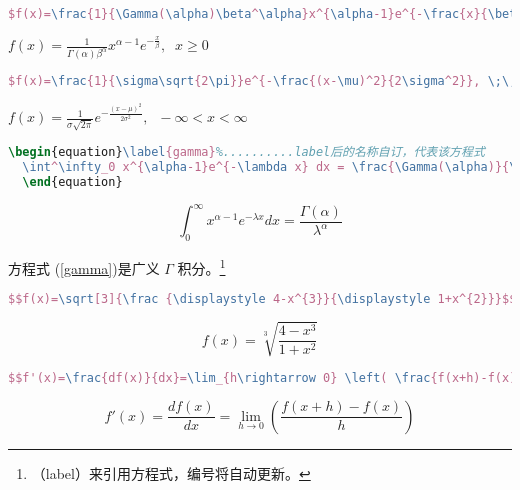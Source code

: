   \begin{lstlisting}[language=TeX,numbers=none,frame=lrtb,keywords={begin},label=Gamma,caption=Gamma] 
  $f(x)=\frac{1}{\Gamma(\alpha)\beta^\alpha}x^{\alpha-1}e^{-\frac{x}{\beta}}, \;\; x\geq 0$
  \end{lstlisting}
  $f(x)=\frac{1}{\Gamma(\alpha)\beta^\alpha}x^{\alpha-1}e^{-\frac{x}{\beta}}, \;\; x\geq 0$ 
  
  \begin{lstlisting}[language=TeX,numbers=none,frame=lrtb,keywords={begin},label=Normal,caption=Normal] 
  $f(x)=\frac{1}{\sigma\sqrt{2\pi}}e^{-\frac{(x-\mu)^2}{2\sigma^2}}, \;\;  -\infty < x < \infty $
  \end{lstlisting}
  $f(x)=\frac{1}{\sigma\sqrt{2\pi}}e^{-\frac{(x-\mu)^2}{2\sigma^2}}, \;\;  -\infty < x < \infty $
  
    \begin{lstlisting}[language=TeX,numbers=none,frame=lrtb,keywords={begin},label=Int,caption=\song 积分式与方程式编号] 
  \begin{equation}\label{gamma}%..........label后的名称自订，代表该方程式
  \int^\infty_0 x^{\alpha-1}e^{-\lambda x} dx = \frac{\Gamma(\alpha)}{\lambda^{\alpha}}
  \end{equation}
  \end{lstlisting}
  \begin{equation}\label{gamma}%
  \int^\infty_0 x^{\alpha-1}e^{-\lambda x} dx = \frac{\Gamma(\alpha)}{\lambda^{\alpha}}
  \end{equation}
  
  方程式 (\ref{gamma})是广义 $\Gamma$ 积分。\footnote{（label）来引用方程式，编号将自动更新。}
  
  \begin{lstlisting}[language=TeX,numbers=none,frame=lrtb,keywords={begin},label=Sqrt,caption=\song 开根号] 
  $$f(x)=\sqrt[3]{\frac {\displaystyle 4-x^{3}}{\displaystyle 1+x^{2}}}$$
  \end{lstlisting}
  $$f(x)=\sqrt[3]{\frac {\displaystyle 4-x^{3}}{\displaystyle 1+x^{2}}}$$
  
  \begin{lstlisting}[language=TeX,numbers=none,frame=lrtb,keywords={begin},label=limit,caption=\song 微分与极限（注意大刮号的使用）] 
  $$f'(x)=\frac{df(x)}{dx}=\lim_{h\rightarrow 0} \left( \frac{f(x+h)-f(x)}{h} \right)$$
  \end{lstlisting}  
  $$f'(x)=\frac{df(x)}{dx}=\lim_{h\rightarrow 0}\left(\frac{f(x+h)-f(x)}{h}\right)$$
  
